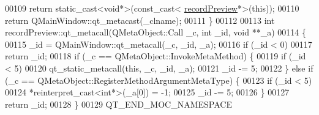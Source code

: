 \begin{DoxyCode}
00109         \textcolor{keywordflow}{return} \textcolor{keyword}{static\_cast<}\textcolor{keywordtype}{void}*\textcolor{keyword}{>}(\textcolor{keyword}{const\_cast<} \hyperlink{a00073}{recordPreview}*\textcolor{keyword}{>}(\textcolor{keyword}{this}));
00110     \textcolor{keywordflow}{return} QMainWindow::qt\_metacast(\_clname);
00111 \}
00112 
00113 \textcolor{keywordtype}{int} recordPreview::qt\_metacall(QMetaObject::Call \_c, \textcolor{keywordtype}{int} \_id, \textcolor{keywordtype}{void} **\_a)
00114 \{
00115     \_id = QMainWindow::qt\_metacall(\_c, \_id, \_a);
00116     \textcolor{keywordflow}{if} (\_id < 0)
00117         \textcolor{keywordflow}{return} \_id;
00118     \textcolor{keywordflow}{if} (\_c == QMetaObject::InvokeMetaMethod) \{
00119         \textcolor{keywordflow}{if} (\_id < 5)
00120             qt\_static\_metacall(\textcolor{keyword}{this}, \_c, \_id, \_a);
00121         \_id -= 5;
00122     \} \textcolor{keywordflow}{else} \textcolor{keywordflow}{if} (\_c == QMetaObject::RegisterMethodArgumentMetaType) \{
00123         \textcolor{keywordflow}{if} (\_id < 5)
00124             *\textcolor{keyword}{reinterpret\_cast<}\textcolor{keywordtype}{int}*\textcolor{keyword}{>}(\_a[0]) = -1;
00125         \_id -= 5;
00126     \}
00127     \textcolor{keywordflow}{return} \_id;
00128 \}
00129 QT\_END\_MOC\_NAMESPACE
\end{DoxyCode}
